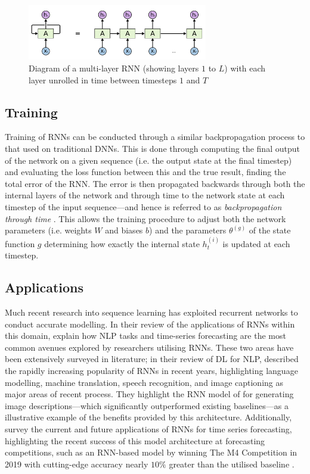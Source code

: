 \documentclass[a4paper, 11pt]{report}
\begin{document}
    \begin{figure}[ht]
        \label{fig: deep-rnn}
        \centering
        \includegraphics[width=0.7\textwidth]{rnn.png}
        \caption{\centering Diagram of a multi-layer RNN (showing layers $1$ to $L$) with each layer unrolled in time between timesteps $1$ and $T$}
    \end{figure}


    \subsection{Training}

    Training of RNNs can be conducted through a similar backpropagation process to that used on traditional DNNs. This is done through computing the final output of the network on a given sequence (i.e. the output state at the final timestep) and evaluating the loss function between this and the true result, finding the total error of the RNN. The error is then propagated backwards through both the internal layers of the network and through time to the network state at each timestep of the input sequence---and hence is referred to as \emph{backpropagation through time} \citep{zhang-2021}. This allows the training procedure to adjust both the network parameters (i.e. weights $W$ and biases $b$) and the parameters $\theta^{(g)}$ of the state function $g$ determining how exactly the internal state $h^{(i)}_t$ is updated at each timestep.


    \subsection{Applications}

    Much recent research into sequence learning has exploited recurrent networks to conduct accurate modelling. In their review of the applications of RNNs within this domain, \citet{lipton-2015} explain how NLP tasks and time-series forecasting are the most common avenues explored by researchers utilising RNNs. These two areas have been extensively surveyed in literature; in their review of DL for NLP, described the rapidly increasing popularity of RNNs in recent years, highlighting language modelling, machine translation, speech recognition, and image captioning as major areas of recent process. They highlight the RNN model of \citet{karpathy-2015} for generating image descriptions---which significantly outperformed existing baselines---as a illustrative example of the benefits provided by this architecture. Additionally, \citet{hewamalage-2021} survey the current and future applications of RNNs for time series forecasting, highlighting the recent success of this model architecture at forecasting competitions, such as an RNN-based model by \citet{smyl-2020} winning The M4 Competition in 2019 with cutting-edge accuracy nearly $10\%$ greater than the utilised baseline \citep{makridakis-2020}.
\end{document}
